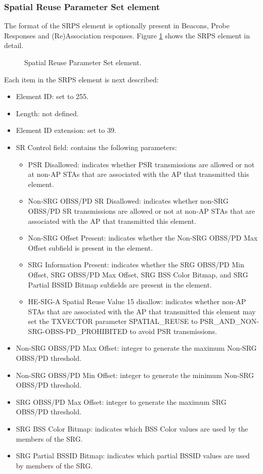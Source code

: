 \documentclass{ieeeaccess}
\begin{document}
\subsubsection{Spatial Reuse Parameter Set element}
\label{section:srps}
The format of the SRPS element is optionally present in Beacons, Probe Responses and (Re)Association responses. Figure 	\ref{fig:appendix_2} shows the SRPS element in detail.
\begin{figure}[ht!]
	\centering
	\caption{Spatial Reuse Parameter Set element.}
	\label{fig:appendix_2}
\end{figure}

Each item in the SRPS element is next described:
\begin{itemize}
	\item Element ID: set to 255.
	\item Length: not defined.
	\item Element ID extension: set to 39.
	\item SR Control field: contains the following parameters:
	\begin{itemize}
		\item PSR Disallowed: indicates whether PSR transmissions are allowed or not at non-AP STAs that are associated with the AP that transmitted this element.
		\item Non-SRG OBSS/PD SR Disallowed: indicates whether non-SRG OBSS/PD SR transmissions are allowed or not at non-AP STAs that are associated with the AP that transmitted this element.
		\item Non-SRG Offset Present: indicates whether the Non-SRG OBSS/PD Max Offset subfield is present in the element.
		\item SRG Information Present: indicates whether the SRG OBSS/PD Min Offset, SRG OBSS/PD Max Offset, SRG BSS Color Bitmap, and SRG Partial BSSID Bitmap subfields are present in the element.
		\item HE-SIG-A Spatial Reuse Value 15 disallow: indicates whether non-AP STAs that are associated with the AP that transmitted this element may set the TXVECTOR parameter SPATIAL\_REUSE to PSR\_AND\_NON-SRG-OBSS-PD\_PROHIBITED to avoid PSR transmissions.
	\end{itemize}
	\item Non-SRG OBSS/PD Max Offset: integer to generate the maximum Non-SRG OBSS/PD threshold.
	\item Non-SRG OBSS/PD Min Offset: integer to generate the minimum Non-SRG OBSS/PD threshold.
	\item SRG OBSS/PD Max Offset: integer to generate the maximum SRG OBSS/PD threshold.
	\item SRG BSS Color Bitmap: indicates which BSS Color values are used by the members of the SRG.
	\item SRG Partial BSSID Bitmap: indicates which partial BSSID values are used by members of the SRG.
\end{itemize}
\end{document}
